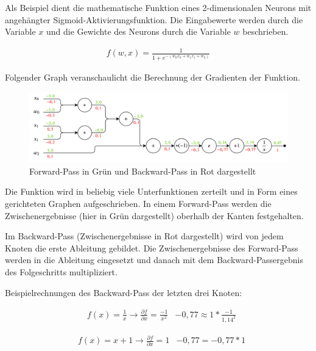 Als Beispiel dient die mathematische Funktion eines 2-dimensionalen Neurons mit angehängter Sigmoid-Aktivierungsfunktion. Die Eingabewerte werden durch die Variable $ x $ und die Gewichte des Neurons durch die Variable $ w $ beschrieben.

\begin{align}
	f(w, x) = \frac{1}{ 1 + e^{ - (w_{0}x_{0} + w_{1}x_{1} + w_{2}) } }
\end{align}

\pagebreak

Folgender Graph veranschaulicht die Berechnung der Gradienten der Funktion.

\begin{figure}[H]
	\centering
	\includegraphics[width=1\textwidth]{resources/content/backpropagation.png}
	\caption{Forward-Pass in Grün und Backward-Pass in Rot dargestellt \cite{cs231n2}}
	\label{img:backpropagation_img}
\end{figure}

Die Funktion wird in beliebig viele Unterfunktionen zerteilt und in Form eines gerichteten Graphen aufgeschrieben.
In einem Forward-Pass werden die Zwischenergebnisse (hier in Grün dargestellt) oberhalb der Kanten festgehalten.

Im Backward-Pass (Zwischenergebnisse in Rot dargestellt) wird von jedem Knoten die erste Ableitung gebildet. Die Zwischenergebnisse des Forward-Pass werden in die Ableitung eingesetzt und danach mit dem Backward-Passergebnis des Folgeschritts multipliziert.

Beispielrechnungen des Backward-Pass der letzten drei Knoten: 

\begin{align}
	& f(x) = \frac{1}{x} \rightarrow \frac{\partial f}{\partial x} = \frac{-1}{ x^{2} }
	& -0,77 \approx 1 * \frac{-1}{ 1,14^{2} }
\end{align}

\begin{align}
	& f(x) = x + 1 \rightarrow \frac{\partial f}{\partial x} = 1
	& -0,77 = -0,77 * 1
\end{align}

